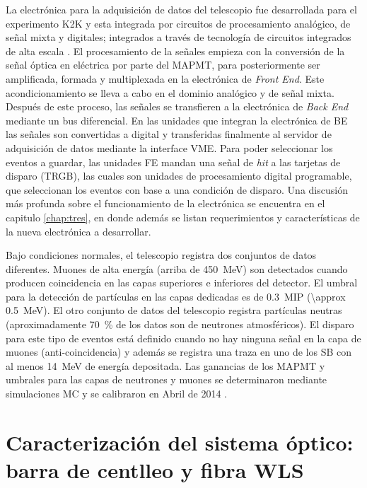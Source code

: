La electrónica para la adquisición de datos del telescopio fue desarrollada para el experimento K2K y esta integrada por circuitos de procesamiento analógico, de señal mixta y digitales; integrados a través de tecnología de circuitos integrados de alta escala \cite{myoshi04}. El procesamiento de la señales empieza con la conversión de la señal óptica en eléctrica por parte del MAPMT, para posteriormente ser amplificada, formada y multiplexada en la electrónica de \emph{Front End}. Este acondicionamiento se lleva a cabo en el dominio analógico y de señal mixta. Después de este proceso, las señales se transfieren a la electrónica de \emph{Back End} mediante un bus diferencial. En las unidades que integran la electrónica de BE las señales son convertidas a digital y transferidas finalmente al servidor de adquisición de datos mediante la interface VME. Para poder seleccionar los eventos a guardar, las unidades FE mandan una señal de \emph{hit} a las tarjetas de disparo (TRGB), las cuales son unidades de procesamiento digital programable, que seleccionan los eventos con base a una condición de disparo. Una discusión más profunda sobre el funcionamiento de la electrónica se encuentra en el capitulo \ref{chap:tres}, en donde además se listan requerimientos y características de la nueva electrónica a desarrollar.

Bajo condiciones normales, el telescopio registra dos conjuntos de datos diferentes. Muones de alta energía (arriba de \SI{450}{\mega\electronvolt}) son detectados cuando producen coincidencia en las capas superiores e inferiores del detector. El umbral para la detección de partículas en las capas dedicadas es de \SI{0.3}{MIP} (\SI{\approx 0.5}{\mega\electronvolt}). El otro conjunto de datos del telescopio registra partículas neutras (aproximadamente \SI{70}{\percent} de los datos son de neutrones atmosféricos). El disparo para este tipo de eventos está definido cuando no hay ninguna señal en la capa de muones (anti-coincidencia) y además se registra una traza en uno de los SB con al menos \SI{14}{\mega\electronvolt} de energía depositada. Las ganancias de los MAPMT y umbrales para las capas de neutrones y muones se determinaron mediante simulaciones MC y se calibraron en Abril de \num{2014} \cite{ysasai14}.

\section{Caracterización del sistema óptico: barra de centlleo y fibra WLS}

